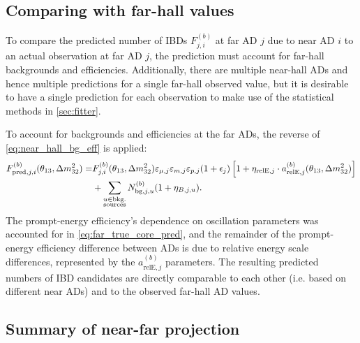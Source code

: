 \subsection{Comparing with far-hall values}
\label{subsec:far_bg_eff}

To compare the predicted number of IBDs $F_{j,i}^{(b)}$
at far AD $j$ due to near AD $i$
to an actual observation at far AD $j$,
the prediction must account for far-hall backgrounds and efficiencies.
Additionally, there are multiple near-hall ADs
and hence multiple predictions for a single far-hall observed value,
but it is desirable to have a single prediction for each observation
to make use of the statistical methods in \cref{sec:fitter}.

To account for backgrounds and efficiencies at the far ADs,
the reverse of \cref{eq:near_hall_bg_eff} is applied:
\begin{align}\label{eq:far_hall_bg_eff}
    \begin{split}
        F_{\text{pred},j,i}^{(b)}(\theta_{13},\Delta m^2_{32})
        = &F_{j,i}^{(b)}(\theta_{13},\Delta m^2_{32})
            \varepsilon_{\mu,j}\varepsilon_{m,j}\varepsilon_{p,j}
            (1 + \epsilon_j)
            \left[1 + \eta_{\text{relE},j}\cdot
            a_{\text{relE},j}^{(b)}(\theta_{13},\Delta m^2_{32})\right] \\
          &+ \sum_{\substack{u \in \text{bkg.}\\\text{sources}}}
        N_{\text{bg},j,u}^{(b)}(1 + \eta_{B,j,u}).
    \end{split}
\end{align}
The prompt-energy efficiency's dependence on oscillation parameters
was accounted for in \cref{eq:far_true_core_pred},
and the remainder of the prompt-energy efficiency difference between ADs
is due to relative energy scale differences,
represented by the $a_{\text{relE},j}^{(b)}$ parameters.
The resulting predicted numbers of IBD candidates
are directly comparable to each other (i.e. based on different near ADs)
and to the observed far-hall AD values.

\subsection{Summary of near-far projection}
\label{subsec:model_summary}

